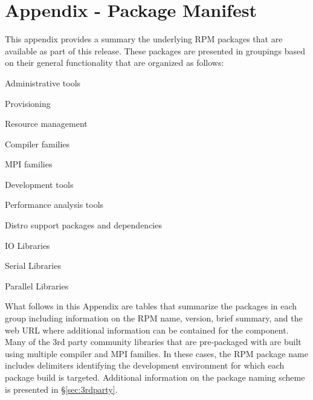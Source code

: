 \clearpage

\appendix
\section*{Appendix - Package Manifest}
\renewcommand{\thesubsection}{\Alph{subsection}}


This appendix provides a summary the underlying RPM packages that are available
as part of this \FSP{} release. These packages are presented in groupings
based on their general functionality that are organized as follows:

\begin{itemize*}
\item Administrative tools
\item Provisioning
\item Resource management
\item Compiler families
\item MPI families
\item Development tools
\item Performance analysis tools
\item Distro support packages and dependencies
\item IO Libraries
\item Serial Libraries
\item Parallel Libraries
\end{itemize*}

What follows in this Appendix are tables that summarize the packages in each
group including information on the RPM name, version, brief summary, and the web
URL where additional information can be contained for the component. Many of the 3rd
party community libraries that are pre-packaged with \FSP{} are built using
multiple compiler and MPI families. In these cases, the RPM package name
includes delimiters identifying the development environment for which each
package build is targeted.  Additional information on the \FSP{} package
naming scheme is presented in \S\ref{sec:3rdparty}.



\newcommand{\firstColWidth}{3.5cm}
\newcommand{\secondColWidth}{1.5cm}

